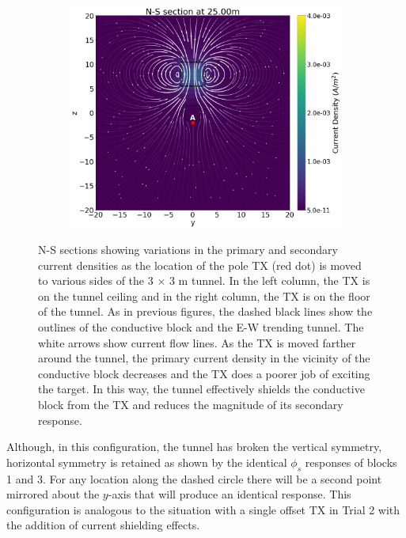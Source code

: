 \documentclass[preprint,authoryear,12pt]{elsarticle}
\begin{document}
\begin{figure}[htp]{}
\begin{center}
\begin{subfigure}{0.5\linewidth}
      \end{subfigure}\hspace{-0.9cm}
      \begin{subfigure}{0.5\linewidth}
         \label{fig:Js_SingleLinearArray_Bottom_Blk5m_ZLocBlkCenter8m_3x3Tunnel_X}
         \includegraphics[trim=0cm 0cm 0cm 0cm, clip=true,width=\linewidth]{./figures/Fig6d.png}
      \end{subfigure}
   \end{center}
\vspace{-0.4cm}
\caption{N-S sections showing variations in the primary and secondary current densities as the location of the pole TX (red dot) is moved to various sides of the 3 $\times$ 3 m tunnel. In the left column, the TX is on the tunnel ceiling and in the right column, the TX is on the floor of the tunnel. As in previous figures, the dashed black lines show the outlines of the conductive block and the E-W trending tunnel. The white arrows show current flow lines. As the TX is moved farther around the tunnel, the primary current density in the vicinity of the conductive block decreases and the TX does a poorer job of exciting the target. In this way, the tunnel effectively shields the conductive block from the TX and reduces the magnitude of its secondary response.}
\label{fig:J_TunnelEffects_Top_Blk5m_3x3Tunnel_Elec_TopSideBottom}
\end{figure}

Although, in this configuration, the tunnel has broken the vertical symmetry, horizontal symmetry is retained as shown by the identical $\phi_{s}$ responses of blocks 1 and 3. For any location along the dashed circle there will be a second point mirrored about the $y$-axis that will produce an identical response. This configuration is analogous to the situation with a single offset TX in Trial 2 with the addition of current shielding effects.
\end{document}
